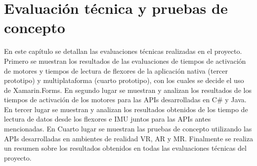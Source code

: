 \newpage
\chapter{Evaluación técnica y pruebas de concepto}
En este capítulo se detallan las evaluaciones técnicas realizadas en el proyecto. Primero se muestran los resultados de las evaluaciones de tiempos de activación de motores y tiempos de lectura de flexores de la aplicación nativa (tercer prototipo) y multiplataforma (cuarto prototipo), con los cuales se decide el uso de Xamarin.Forms. En segundo lugar se muestran y analizan los resultados de los tiempos de activación de los motores para las APIs desarrolladas en C\# y Java. En tercer lugar se muestran y analizan los resultados obtenidos de los tiempo de lectura de datos desde los flexores e IMU juntos para las APIs antes mencionadas. En Cuarto lugar se muestran las pruebas de concepto utilizando las APIs desarrolladas en ambientes de realidad VR, AR y MR. Finalmente se realiza un resumen sobre los resultados obtenidos en todas las evaluaciones técnicas del proyecto.